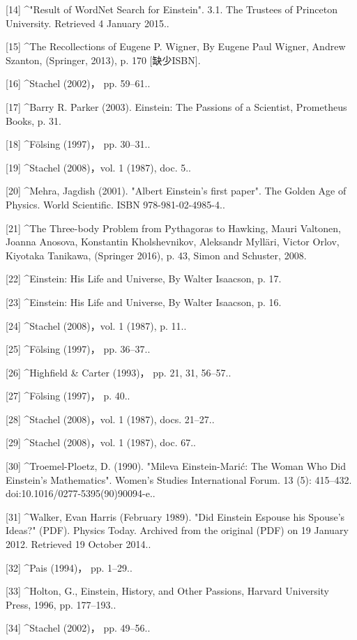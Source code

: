 [14]
^"Result of WordNet Search for Einstein". 3.1. The Trustees of Princeton University. Retrieved 4 January 2015..

[15]
^The Recollections of Eugene P. Wigner, By Eugene Paul Wigner, Andrew Szanton, (Springer, 2013), p. 170 [缺少ISBN].

[16]
^Stachel (2002)， pp. 59–61..

[17]
^Barry R. Parker (2003). Einstein: The Passions of a Scientist, Prometheus Books, p. 31.

[18]
^Fölsing (1997)， pp. 30–31..

[19]
^Stachel (2008)，vol. 1 (1987), doc. 5..

[20]
^Mehra, Jagdish (2001). "Albert Einstein's first paper". The Golden Age of Physics. World Scientific. ISBN 978-981-02-4985-4..

[21]
^The Three-body Problem from Pythagoras to Hawking, Mauri Valtonen, Joanna Anosova, Konstantin Kholshevnikov, Aleksandr Mylläri, Victor Orlov, Kiyotaka Tanikawa, (Springer 2016), p. 43, Simon and Schuster, 2008.

[22]
^Einstein: His Life and Universe, By Walter Isaacson, p. 17.

[23]
^Einstein: His Life and Universe, By Walter Isaacson, p. 16.

[24]
^Stachel (2008)，vol. 1 (1987), p. 11..

[25]
^Fölsing (1997)， pp. 36–37..

[26]
^Highfield & Carter (1993)， pp. 21, 31, 56–57..

[27]
^Fölsing (1997)， p. 40..

[28]
^Stachel (2008)，vol. 1 (1987), docs. 21–27..

[29]
^Stachel (2008)，vol. 1 (1987), doc. 67..

[30]
^Troemel-Ploetz, D. (1990). "Mileva Einstein-Marić: The Woman Who Did Einstein's Mathematics". Women's Studies International Forum. 13 (5): 415–432. doi:10.1016/0277-5395(90)90094-e..

[31]
^Walker, Evan Harris (February 1989). "Did Einstein Espouse his Spouse's Ideas?" (PDF). Physics Today. Archived from the original (PDF) on 19 January 2012. Retrieved 19 October 2014..

[32]
^Pais (1994)， pp. 1–29..

[33]
^Holton, G., Einstein, History, and Other Passions, Harvard University Press, 1996, pp. 177–193..

[34]
^Stachel (2002)， pp. 49–56..

